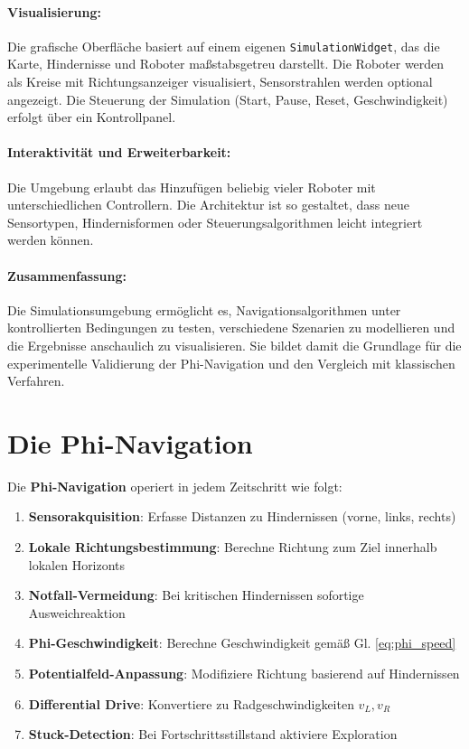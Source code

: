﻿\documentclass[a4paper,12pt]{article}
\theoremstyle{definition}
\begin{document}
\paragraph{Visualisierung:}
Die grafische Oberfläche basiert auf einem eigenen \texttt{SimulationWidget}, das die Karte, Hindernisse und Roboter maßstabsgetreu darstellt. Die Roboter werden als Kreise mit Richtungsanzeiger visualisiert, Sensorstrahlen werden optional angezeigt. Die Steuerung der Simulation (Start, Pause, Reset, Geschwindigkeit) erfolgt über ein Kontrollpanel.

\paragraph{Interaktivität und Erweiterbarkeit:}
Die Umgebung erlaubt das Hinzufügen beliebig vieler Roboter mit unterschiedlichen Controllern. Die Architektur ist so gestaltet, dass neue Sensortypen, Hindernisformen oder Steuerungsalgorithmen leicht integriert werden können.

\paragraph{Zusammenfassung:}
Die Simulationsumgebung ermöglicht es, Navigationsalgorithmen unter kontrollierten Bedingungen zu testen, verschiedene Szenarien zu modellieren und die Ergebnisse anschaulich zu visualisieren. Sie bildet damit die Grundlage für die experimentelle Validierung der Phi-Navigation und den Vergleich mit klassischen Verfahren.

\section{Die Phi-Navigation}

Die \textbf{Phi-Navigation} operiert in jedem Zeitschritt wie folgt:

\begin{enumerate}
	\item[-] \textbf{Sensorakquisition}: Erfasse Distanzen zu Hindernissen (vorne, links, rechts)
	\item[-] \textbf{Lokale Richtungsbestimmung}: Berechne Richtung zum Ziel innerhalb lokalen Horizonts
	\item[-] \textbf{Notfall-Vermeidung}: Bei kritischen Hindernissen sofortige Ausweichreaktion
	\item[-] \textbf{Phi-Geschwindigkeit}: Berechne Geschwindigkeit gemäß Gl. \eqref{eq:phi_speed}
	\item[-] \textbf{Potentialfeld-Anpassung}: Modifiziere Richtung basierend auf Hindernissen
	\item[-] \textbf{Differential Drive}: Konvertiere zu Radgeschwindigkeiten $v_L, v_R$
	\item[-] \textbf{Stuck-Detection}: Bei Fortschrittsstillstand aktiviere Exploration
\end{enumerate}
\end{document}
